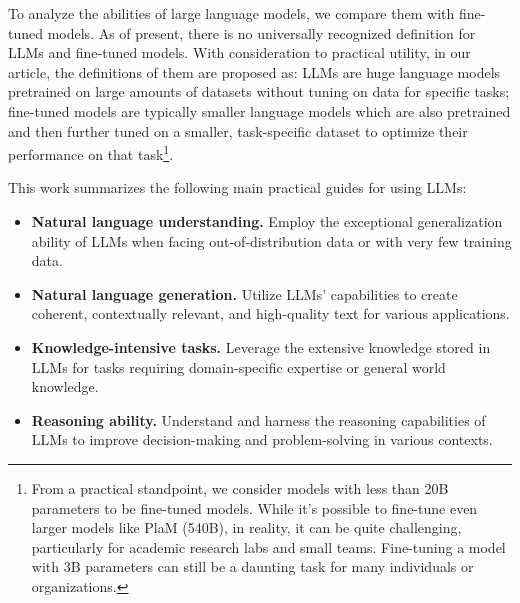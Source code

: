 \documentclass[manuscript,screen, nonacm]{acmart}
\begin{document}
To analyze the abilities of large language models, we compare them with fine-tuned models. 
As of present, there is no universally recognized definition for LLMs and fine-tuned models. With consideration to practical utility, in our article, the definitions of them are proposed as: LLMs are huge language models pretrained on large amounts of datasets without tuning on data for specific tasks; fine-tuned models are typically smaller language models which are also pretrained and then further tuned on a smaller, task-specific dataset to optimize their performance on that task\footnote{From a practical standpoint, we consider models with less than 20B parameters to be fine-tuned models. While it's possible to fine-tune even larger models like PlaM (540B), in reality, it can be quite challenging, particularly for academic research labs and small teams. Fine-tuning a model with 3B parameters can still be a daunting task for many individuals or organizations.}. 

This work summarizes the following main practical guides for using LLMs:
\begin{itemize}
    \item \textbf{Natural language understanding.} Employ the exceptional generalization ability of LLMs when facing out-of-distribution data or with very few training data. 
    \item \textbf{Natural language generation.} Utilize LLMs' capabilities to create coherent, contextually relevant, and high-quality text for various applications.
    \item \textbf{Knowledge-intensive tasks.} Leverage the extensive knowledge stored in LLMs for tasks requiring domain-specific expertise or general world knowledge.
    \item \textbf{Reasoning ability.} Understand and harness the reasoning capabilities of LLMs to improve decision-making and problem-solving in various contexts.
\end{itemize}
\end{document}
